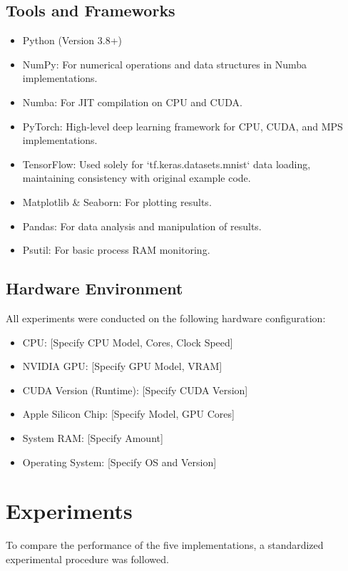 \documentclass[conference]{IEEEtran} %
\begin{document}
\subsection{Tools and Frameworks}
\begin{itemize}
    \item Python (Version 3.8+)
    \item NumPy: For numerical operations and data structures in Numba implementations.
    \item Numba: For JIT compilation on CPU and CUDA.
    \item PyTorch: High-level deep learning framework for CPU, CUDA, and MPS implementations.
    \item TensorFlow: Used solely for `tf.keras.datasets.mnist` data loading, maintaining consistency with original example code.
    \item Matplotlib \& Seaborn: For plotting results.
    \item Pandas: For data analysis and manipulation of results.
    \item Psutil: For basic process RAM monitoring.
\end{itemize}

\subsection{Hardware Environment}
All experiments were conducted on the following hardware configuration:
\begin{itemize}
    \item CPU: [Specify CPU Model, Cores, Clock Speed]
    \item NVIDIA GPU: [Specify GPU Model, VRAM]
    \item CUDA Version (Runtime): [Specify CUDA Version]
    \item Apple Silicon Chip: [Specify Model, GPU Cores]
    \item System RAM: [Specify Amount]
    \item Operating System: [Specify OS and Version]
\end{itemize}

\section{Experiments}
\label{sec:experiments}
To compare the performance of the five implementations, a standardized experimental procedure was followed.
\end{document}
